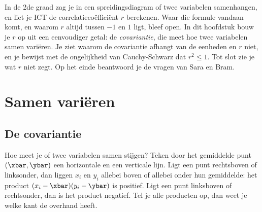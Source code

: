In de 2de graad zag je in een spreidingsdiagram of twee variabelen samenhangen, en liet je ICT de correlatiecoëfficiënt $r$ berekenen. Waar die formule vandaan komt, en waarom $r$ altijd tussen $-1$ en $1$ ligt, bleef open. In dit hoofdstuk bouw je $r$ op uit een eenvoudiger getal: de \textit{covariantie}, die meet hoe twee variabelen samen variëren. Je ziet waarom de covariantie afhangt van de eenheden en $r$ niet, en je bewijst met de ongelijkheid van Cauchy-Schwarz dat $r^2 \leqslant 1$. Tot slot zie je wat $r$ niet zegt. Op het einde beantwoord je de vragen van Sara en Bram.

\begin{oefeningen}[Start]

\end{oefeningen}


\section{Samen variëren}

\subsection{De covariantie}

Hoe meet je of twee variabelen samen stijgen? Teken door het gemiddelde punt $(\xbar, \ybar)$ een horizontale en een verticale lijn. Ligt een punt rechtsboven of linksonder, dan liggen $x_i$ en $y_i$ allebei boven of allebei onder hun gemiddelde: het product $(x_i - \xbar)(y_i - \ybar)$ is positief. Ligt een punt linksboven of rechtsonder, dan is het product negatief. Tel je alle producten op, dan weet je welke kant de overhand heeft.

